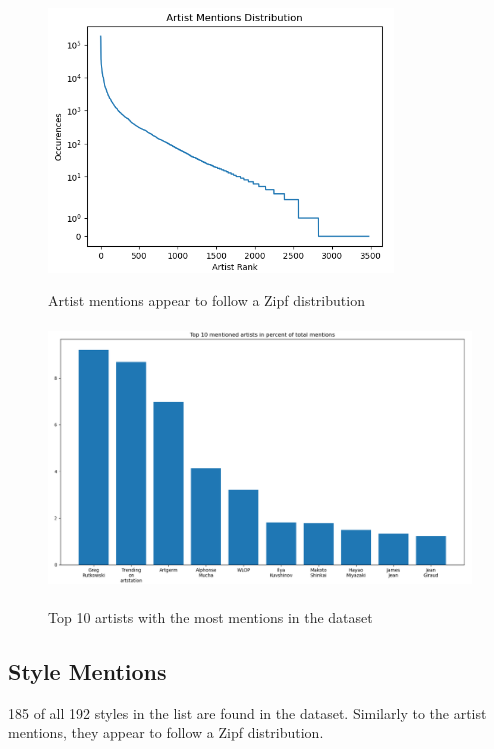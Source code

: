 \begin{figure}[h]
    \begin{center}
        \includegraphics[height=7cm]{Bilder/artist_mentions_distribution_scale_symlog.png}\\[2.5ex]
    \end{center}
\caption{Artist mentions appear to follow a Zipf distribution}
\end{figure}

\begin{figure}[h]
    \begin{center}
        \includegraphics[height=7cm]{Bilder/top10_artists.png}\\[2.5ex]
    \end{center}
\caption{Top 10 artists with the most mentions in the dataset}
\label{fig:top10_artists}
\end{figure}


\subsection{Style Mentions}

185 of all 192 styles in the list are found in the dataset. Similarly to the artist mentions, they appear to follow a Zipf distribution.


